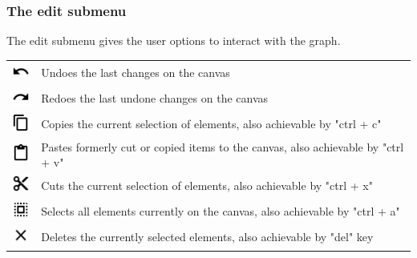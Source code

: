 \subsubsection{The edit submenu}
The edit submenu gives the user options to interact with the graph.
\begin{tabular}{p{}p{}}
 \includegraphics[scale=0.6]{figures/icons/undo.png} & Undoes the last changes on the canvas\\
 \includegraphics[scale=0.6]{figures/icons/redo.png} & Redoes the last undone changes on the canvas\\
 \includegraphics[scale=0.6]{figures/icons/copy.png} & Copies the current selection of elements, also achievable by "ctrl + c"\\
 \includegraphics[scale=0.6]{figures/icons/paste.png} & Pastes formerly cut or copied items to the canvas, also achievable by "ctrl + v"\\
 \includegraphics[scale=0.6]{figures/icons/cut.png} & Cuts the current selection of elements, also achievable by "ctrl + x" \\
 \includegraphics[scale=0.6]{figures/icons/select_all.png} & 
Selects all elements currently on the canvas, also achievable by "ctrl + a"\\
\includegraphics[scale=0.6]{figures/icons/delete_all.png} & Deletes the currently selected elements, also achievable by "del" key\\[12pt]

\end{tabular}
